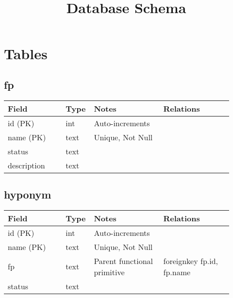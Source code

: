 \documentclass{article}
\title{Database Schema}
\begin{document}
\maketitle

\tableofcontents



\section{Tables}


\subsection{fp}

{\footnotesize
\begin{centering}
\begin{tabular}{p{0.25\linewidth}p{0.07\linewidth}p{0.3\linewidth}p{0.3\linewidth}}
\textbf{Field} & \textbf{Type} & \textbf{Notes} & \textbf{Relations} \\
\hline
id (PK) & int & Auto-increments &  \\
\hline
name (PK) & text & Unique, Not Null & \\
\hline
status & text & & \\
\hline
description & text & & \\
\hline
\end{tabular}
\end{centering}
}



\subsection{hyponym}

{\footnotesize
\begin{centering}
\begin{tabular}{p{0.25\linewidth}p{0.07\linewidth}p{0.3\linewidth}p{0.3\linewidth}}
\textbf{Field} & \textbf{Type} & \textbf{Notes} & \textbf{Relations} \\
\hline
id (PK) & int & Auto-increments &  \\
\hline
name (PK) & text & Unique, Not Null & \\
\hline
fp & text & Parent functional primitive & foreignkey fp.id, fp.name \\
\hline
status & text & & \\
\hline
\end{tabular}
\end{centering}
}
\end{document}
